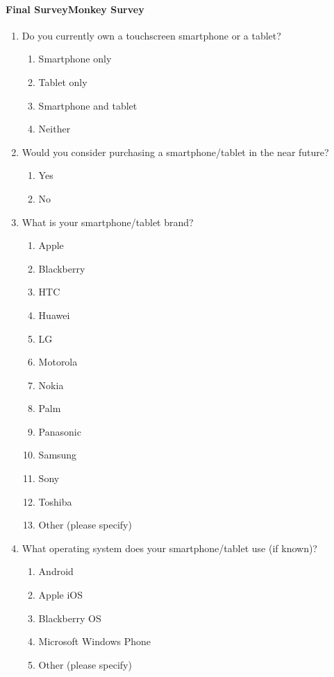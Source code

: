 \documentclass[12pt,a4paper,oneside,titlepage]{article}
\begin{document}
\paragraph{Final SurveyMonkey Survey}
\begin{enumerate}
\item Do you currently own a touchscreen smartphone or a tablet?
\begin{enumerate}
\item Smartphone only
\item Tablet only
\item Smartphone and tablet
\item Neither
\end{enumerate}
\item Would you consider purchasing a smartphone/tablet in the near future?
\begin{enumerate}
\item Yes
\item No
\end{enumerate}
\item What is your smartphone/tablet brand?
\begin{enumerate}
\item Apple
\item Blackberry
\item HTC
\item Huawei
\item LG
\item Motorola
\item Nokia
\item Palm
\item Panasonic
\item Samsung
\item Sony
\item Toshiba
\item Other (please specify) \\
\framebox[8cm]{}
\end{enumerate}
\item What operating system does your smartphone/tablet use (if known)?
\begin{enumerate}
\item Android
\item Apple iOS
\item Blackberry OS
\item Microsoft Windows Phone
\item Other (please specify) \\
\framebox[8cm]{}
\end{enumerate}

\end{enumerate}
\end{document}

